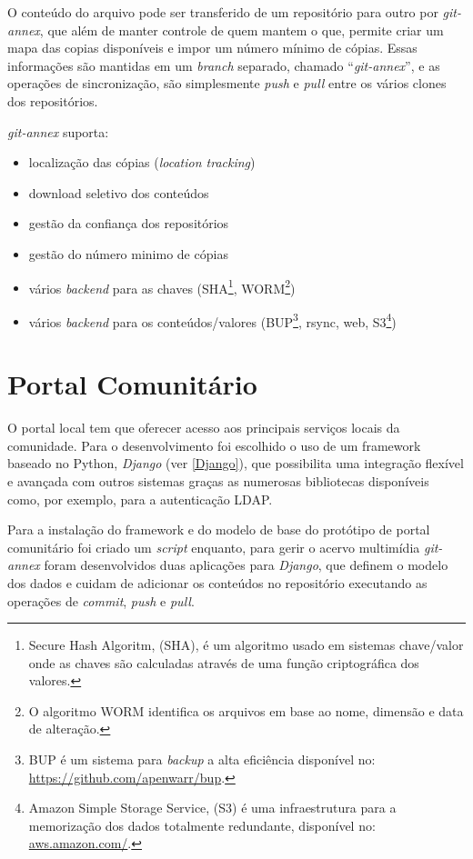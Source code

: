 O conteúdo do arquivo pode ser transferido de um repositório para
outro por \emph{git-annex}, que além de manter controle de quem mantem
o que, permite criar um mapa das copias disponíveis e impor um número
mínimo de cópias. Essas informações são mantidas em um \emph{branch}
separado, chamado ``\emph{git-annex}'', e as operações de
sincronização, são simplesmente \emph{push} e \emph{pull} entre os
vários clones dos repositórios.

\emph{git-annex} suporta:
\begin{itemize}
\item localização das cópias (\emph{location tracking})
\item download seletivo dos conteúdos 
\item gestão da confiança dos repositórios
\item gestão do número minimo de cópias
\item vários \emph{backend} para as chaves (SHA\footnote{Secure Hash
    Algoritm, (SHA), é um algoritmo usado em sistemas chave/valor onde
    as chaves são calculadas através de uma função criptográfica dos
    valores.}, WORM\footnote{O algoritmo WORM identifica os arquivos
    em base ao nome, dimensão e data de alteração.})
\item vários \emph{backend} para os conteúdos/valores
  (BUP\footnote{BUP é um sistema para \emph{backup} a alta eficiência
    disponível no: \url{https://github.com/apenwarr/bup}.}, rsync,
  web, S3\footnote{Amazon Simple Storage Service, (S3) é uma
    infraestrutura para a memorização dos dados totalmente redundante,
    disponível no: \url{aws.amazon.com/}.})
\end{itemize}

\section{Portal Comunitário}
O portal local tem que oferecer acesso aos principais serviços locais
da comunidade. Para o desenvolvimento foi escolhido o uso de um
framework baseado no Python, \emph{Django} (ver \ref{Django}), que
possibilita uma integração flexível e avançada com outros sistemas
graças as numerosas bibliotecas disponíveis como, por exemplo, para a
autenticação LDAP.

Para a instalação do framework e do modelo de base do protótipo de
portal comunitário foi criado um \emph{script} enquanto, para gerir o
acervo multimídia \emph{git-annex} foram desenvolvidos duas aplicações
para \emph{Django}, que definem o modelo dos dados e cuidam de
adicionar os conteúdos no repositório executando as operações de
\emph{commit}, \emph{push} e \emph{pull}.

